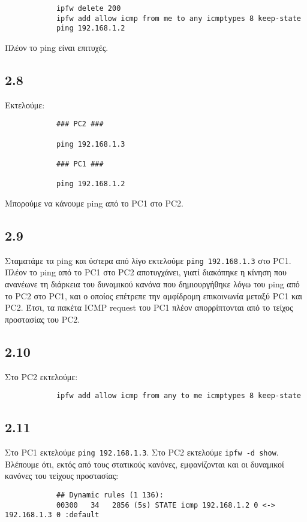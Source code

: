 \documentclass[a4paper, 12pt]{article}
\begin{document}
		\begin{verbatim}
			ipfw delete 200
			ipfw add allow icmp from me to any icmptypes 8 keep-state
			ping 192.168.1.2
		\end{verbatim}
		
		Πλέον το ping είναι επιτυχές.

	\subsection*{2.8}
		Εκτελούμε:
		
		\begin{verbatim}
			### PC2 ###
			
			ping 192.168.1.3
			
			### PC1 ###
			
			ping 192.168.1.2
		\end{verbatim}
		
		Μπορούμε να κάνουμε ping από το PC1 στο PC2.

	\subsection*{2.9}
		Σταματάμε τα ping και ύστερα από λίγο εκτελούμε \verb|ping 192.168.1.3| στο PC1. Πλέον το ping από το PC1 στο PC2 αποτυγχάνει, γιατί διακόπηκε η κίνηση που ανανέωνε τη διάρκεια του δυναμικού κανόνα που δημιουργήθηκε λόγω του ping από το PC2 στο PC1, και ο οποίος επέτρεπε την αμφίδρομη επικοινωνία μεταξύ PC1 και PC2. Έτσι, τα πακέτα ICMP request του PC1 πλέον απορρίπτονται από το τείχος προστασίας του PC2.

	\subsection*{2.10}
		Στο PC2 εκτελούμε:
		
		\begin{verbatim}
			ipfw add allow icmp from any to me icmptypes 8 keep-state
		\end{verbatim}

	\subsection*{2.11}
		Στο PC1 εκτελούμε \verb|ping 192.168.1.3|. Στο PC2 εκτελούμε \verb|ipfw -d show|. Βλέπουμε ότι, εκτός από τους στατικούς κανόνες, εμφανίζονται και οι δυναμικοί κανόνες του τείχους προστασίας:
		
		\begin{verbatim}
			## Dynamic rules (1 136):
			00300   34   2856 (5s) STATE icmp 192.168.1.2 0 <-> 192.168.1.3 0 :default
		\end{verbatim}
\end{document}

